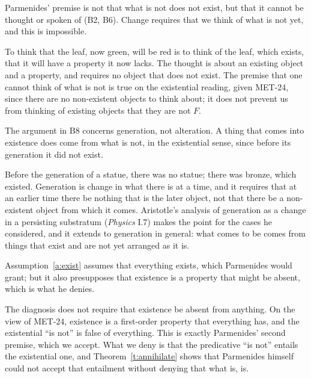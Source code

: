 \documentclass{situationist-preprint}
\begin{document}
\begin{objection}[Thinkability]
Parmenides' premise is not that what is not does not exist, but that it cannot be thought or spoken of (B2, B6). Change requires that we think of what is not yet, and this is impossible.
\end{objection}

\begin{reply}
To think that the leaf, now green, will be red is to think of the leaf, which exists, that it will have a property it now lacks. The thought is about an existing object and a property, and requires no object that does not exist. The premise that one cannot think of what is not is true on the existential reading, given MET-24, since there are no non-existent objects to think about; it does not prevent us from thinking of existing objects that they are not $F$.
\end{reply}

\begin{objection}[Coming to be]
The argument in B8 concerns generation, not alteration. A thing that comes into existence does come from what is not, in the existential sense, since before its generation it did not exist.
\end{objection}

\begin{reply}
Before the generation of a statue, there was no statue; there was bronze, which existed. Generation is change in what there is at a time, and it requires that at an earlier time there be nothing that is the later object, not that there be a non-existent object from which it comes. Aristotle's analysis of generation as a change in a persisting substratum (\emph{Physics} I.7) makes the point for the cases he considered, and it extends to generation in general: what comes to be comes from things that exist and are not yet arranged as it is.
\end{reply}

\begin{objection}
Assumption~\ref{a:exist} assumes that everything exists, which Parmenides would grant; but it also presupposes that existence is a property that might be absent, which is what he denies.
\end{objection}

\begin{reply}
The diagnosis does not require that existence be absent from anything. On the view of MET-24, existence is a first-order property that everything has, and the existential \enquote{is not} is false of everything. This is exactly Parmenides' second premise, which we accept. What we deny is that the predicative \enquote{is not} entails the existential one, and Theorem~\ref{t:annihilate} shows that Parmenides himself could not accept that entailment without denying that what is, is.
\end{reply}
\end{document}
